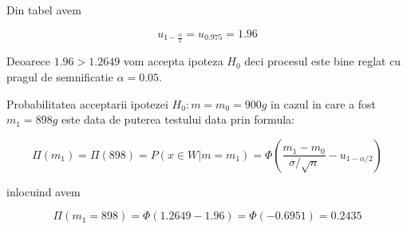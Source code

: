 \documentclass{article}
\begin{document}
Din tabel avem

\[
u_{1-\frac{\alpha }{2}}=u_{0.975}=1.96
\]

Deoarece $1.96>1.2649$ vom accepta ipoteza $H_{0}$ deci procesul este bine
reglat cu pragul de semnificatie $\alpha =0.05$.

Probabilitatea acceptarii ipotezei $H_{0}:m=m_{0}=900g$ in cazul in care a
fost $m_{1}=898g$ este data de puterea testului data prin formula:

\[
\Pi (m_{1})=\Pi (898)=P(x\in W|m=m_{1})=\Phi (\frac{m_{1}-m_{0}}{\sigma /%
\sqrt{n}}-u_{1-\alpha /2})
\]

inlocuind avem

\[
\Pi (m_{1}=898)=\Phi (1.2649-1.96)=\Phi (-0.6951)=0.2435
\]
\end{document}
